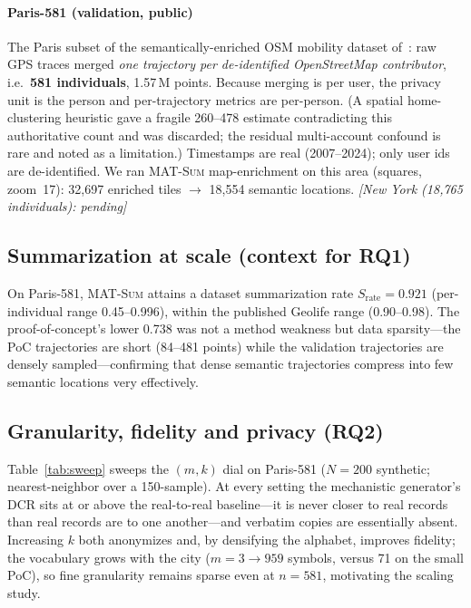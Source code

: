 \documentclass[sigconf,nonacm]{acmart}
\begin{document}
\paragraph{Paris-581 (validation, public)}
The Paris subset of the semantically-enriched OSM mobility dataset of~\cite{pugliese2025}: raw GPS
traces merged \emph{one trajectory per de-identified OpenStreetMap contributor}, i.e.\ \textbf{581
individuals}, 1.57\,M points. Because merging is per user, the privacy unit is the person and
per-trajectory metrics are per-person. (A spatial home-clustering heuristic gave a fragile 260--478
estimate contradicting this authoritative count and was discarded; the residual multi-account confound
is rare and noted as a limitation.) Timestamps are real (2007--2024); only user ids are de-identified.
We ran \textsc{MAT-Sum} map-enrichment on this area (squares, zoom~17): 32{,}697 enriched tiles
$\rightarrow$ 18{,}554 semantic locations. \textit{[New York (18{,}765 individuals): pending]}

\subsection{Summarization at scale (context for RQ1)}
On Paris-581, \textsc{MAT-Sum} attains a dataset summarization rate $S_{\text{rate}}=0.921$
(per-individual range 0.45--0.996), within the published Geolife range (0.90--0.98). The
proof-of-concept's lower 0.738 was not a method weakness but data sparsity---the PoC trajectories are
short (84--481 points) while the validation trajectories are densely sampled---confirming that dense
semantic trajectories compress into few semantic locations very effectively.

\subsection{Granularity, fidelity and privacy (RQ2)}
Table~\ref{tab:sweep} sweeps the $(m,k)$ dial on Paris-581 ($N=200$ synthetic; nearest-neighbor over a
150-sample). At every setting the mechanistic generator's DCR sits at or above the real-to-real
baseline---it is never closer to real records than real records are to one another---and verbatim
copies are essentially absent. Increasing $k$ both anonymizes and, by densifying the alphabet,
improves fidelity; the vocabulary grows with the city ($m{=}3\rightarrow959$ symbols, versus 71 on the
small PoC), so fine granularity remains sparse even at $n{=}581$, motivating the scaling study.
\end{document}
